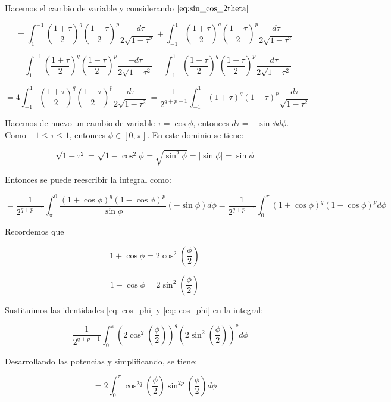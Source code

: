 Hacemos el cambio de variable y considerando $\eqref{eq:sin_cos_2theta}$

\[
    =\int_{1}^{-1}\left(\frac{1+\tau}{2}\right)^q\left(\frac{1-\tau}{2}\right)^p\frac{-d\tau}{2\sqrt{1-\tau^2}}+\int_{-1}^{1}\left(\frac{1+\tau}{2}\right)^q\left(\frac{1-\tau}{2}\right)^p\frac{d\tau}{2\sqrt{1-\tau^2}}
\]

\[
    +\int_{1}^{-1}\left(\frac{1+\tau}{2}\right)^q\left(\frac{1-\tau}{2}\right)^p\frac{-d\tau}{2\sqrt{1-\tau^2}}+\int_{-1}^{1}\left(\frac{1+\tau}{2}\right)^q\left(\frac{1-\tau}{2}\right)^p\frac{d\tau}{2\sqrt{1-\tau^2}}
\]

\[
    =4\int_{-1}^{1}\left(\frac{1+\tau}{2}\right)^q\left(\frac{1-\tau}{2}\right)^p\frac{d\tau}{2\sqrt{1-\tau^2}} = \frac{1}{2^{q+p-1}}\int_{-1}^{1}\left(1+\tau\right)^q\left(1-\tau\right)^p\frac{d\tau}{\sqrt{1-\tau^2}}
\]

Hacemos de nuevo un cambio de variable $\tau=\cos\phi$, entonces $d\tau=-\sin\phi d\phi$. Como $-1\leq\tau\leq1$, entonces $\phi\in[0,\pi]$. En este dominio se tiene:

\[
\sqrt{1-\tau^2}=\sqrt{1-\cos^2\phi}=\sqrt{\sin^2\phi}=\left|\sin\phi\right|=\sin\phi
\]

Entonces se puede reescribir la integral como:

\[
    = \frac{1}{2^{q+p-1}}\int_{\pi}^{0}\frac{\left(1+\cos\phi\right)^q\left(1-\cos\phi\right)^p}{\sin\phi}\left(-\sin\phi\right)d\phi = \frac{1}{2^{q+p-1}}\int_{0}^{\pi}\left(1+\cos\phi\right)^q\left(1-\cos\phi\right)^p d\phi
\]

Recordemos que

\begin{equation}\label{eq: cos_phi}
    1+\cos\phi=2\cos^2\left(\frac{\phi}{2}\right)
\end{equation}

\begin{equation}\label{eq: cos_phi}
    1-\cos\phi=2\sin^2\left(\frac{\phi}{2}\right)
\end{equation}

Sustituimos las identidades \eqref{eq: cos_phi} y \eqref{eq: cos_phi} en la integral:

\[
    = \frac{1}{2^{q+p-1}}\int_{0}^{\pi}\left(2\cos^2\left(\frac{\phi}{2}\right)\right)^q\left(2\sin^2\left(\frac{\phi}{2}\right)\right)^p d\phi
\]

Desarrollando las potencias y simplificando, se tiene:

\[
=2\int_{0}^{\pi}\cos^{2q}\left(\frac{\phi}{2}\right)\sin^{2p}\left(\frac{\phi}{2}\right) d\phi
\]

